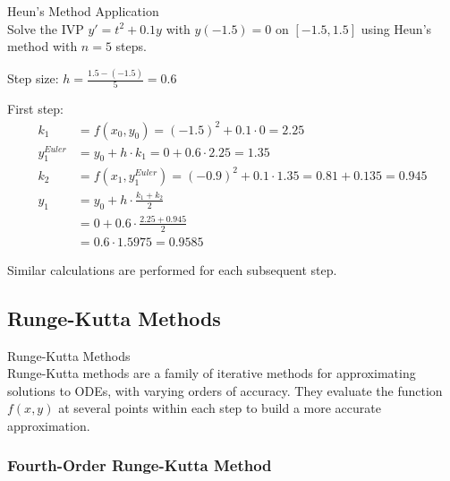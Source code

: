 \begin{example2}{Heun's Method Application}\\
Solve the IVP $y' = t^2 + 0.1y$ with $y(-1.5) = 0$ on $[-1.5, 1.5]$ using Heun's method with $n = 5$ steps.

Step size: $h = \frac{1.5-(-1.5)}{5} = 0.6$

First step:
\begin{align*}
k_1 &= f(x_0, y_0) = (-1.5)^2 + 0.1 \cdot 0 = 2.25\\
y_1^{Euler} &= y_0 + h \cdot k_1 = 0 + 0.6 \cdot 2.25 = 1.35\\
k_2 &= f(x_1, y_1^{Euler}) = (-0.9)^2 + 0.1 \cdot 1.35 = 0.81 + 0.135 = 0.945\\
y_1 &= y_0 + h \cdot \frac{k_1 + k_2}{2}\\
&= 0 + 0.6 \cdot \frac{2.25 + 0.945}{2}\\
&= 0.6 \cdot 1.5975 = 0.9585
\end{align*}

Similar calculations are performed for each subsequent step.
\end{example2}

\subsection{Runge-Kutta Methods}

\begin{definition}{Runge-Kutta Methods}\\
Runge-Kutta methods are a family of iterative methods for approximating solutions to ODEs, with varying orders of accuracy. They evaluate the function $f(x,y)$ at several points within each step to build a more accurate approximation.
\end{definition}

\subsubsection{Fourth-Order Runge-Kutta Method}

